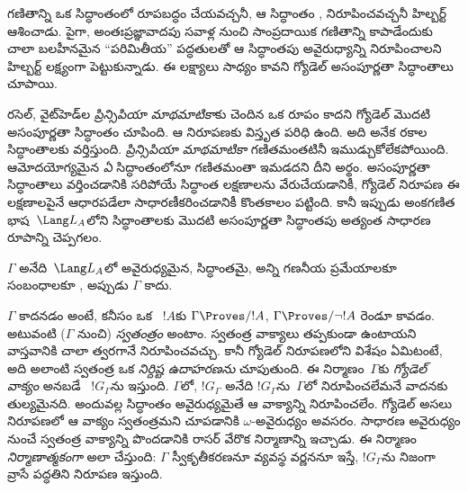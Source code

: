 \documentclass[../../../include/open-logic-section]{subfiles}
\begin{document}


గణితాన్ని ఒక  సిద్ధాంతంలో
రూపబద్ధం చేయవచ్చనీ, ఆ సిద్ధాంతం ,
 నిరూపించవచ్చనీ హిల్బర్ట్ ఆశించాడు.
పైగా, అంతఃప్రజ్ఞావాదపు సవాళ్ల నుంచి సాంప్రదాయిక గణితాన్ని కాపాడేందుకు చాలా
బలహీనమైన ``పరిమితీయ'' పద్ధతులతో ఆ సిద్ధాంతపు అవైరుధ్యాన్ని నిరూపించాలని హిల్బర్ట్
లక్ష్యంగా పెట్టుకున్నాడు. ఈ లక్ష్యాలు సాధ్యం కావని గ్యోడెల్ అసంపూర్ణతా సిద్ధాంతాలు
చూపాయి.

రసెల్, వైట్‌హెడ్‌ల \emph{ప్రిన్సిపియా మాథమాటికా}కు చెందిన ఒక రూపం
 కాదని గ్యోడెల్ మొదటి అసంపూర్ణతా సిద్ధాంతం
చూపింది. ఆ నిరూపణకు విస్తృత పరిధి ఉంది. అది అనేక రకాల సిద్ధాంతాలకు వర్తిస్తుంది.
\emph{ప్రిన్సిపియా మాథమాటికా} గణితమంతటినీ ఇముడ్చుకోలేకపోయింది.
ఆమోదయోగ్యమైన \emph{ఏ} సిద్ధాంతంలోనూ గణితమంతా ఇమడదని దీని అర్థం.
అసంపూర్ణతా సిద్ధాంతాలు వర్తించడానికి సరిపోయే సిద్ధాంత లక్షణాలను వేరుచేయడానికీ,
గ్యోడెల్ నిరూపణ ఈ లక్షణాలపైనే ఆధారపడేలా సాధారణీకరించడానికీ కొంతకాలం పట్టింది.
కానీ ఇప్పుడు అంకగణిత భాష~$\Lang L_A$లోని సిద్ధాంతాలకు మొదటి అసంపూర్ణతా
సిద్ధాంతపు అత్యంత సాధారణ రూపాన్ని చెప్పగలం.

\begin{thm}
$\Gamma$ అనేది~$\Lang L_A$లో అవైరుధ్యమైన,
 సిద్ధాంతమై, అన్ని గణనీయ
ప్రమేయాలకూ  సంబంధాలకూ
, అప్పుడు $\Gamma$
 కాదు.
\end{thm}

$\Gamma$  కాదనడం అంటే, కనీసం ఒక
~$!A$కు $\Gamma \Proves/ !A$, $\Gamma \Proves/
\lnot !A$ రెండూ కావడం. అటువంటి 
($\Gamma$ నుంచి) \emph{స్వతంత్రం} అంటాం. స్వతంత్ర వాక్యాలు తప్పకుండా ఉంటాయని
వాస్తవానికి చాలా త్వరగానే నిరూపించవచ్చు. కానీ గ్యోడెల్ నిరూపణలోని విశేషం
ఏమిటంటే, అది అలాంటి స్వతంత్ర  ఒక
\emph{నిర్దిష్ట ఉదాహరణను} చూపుతుంది. ఈ నిర్మాణం~$\Gamma$కు
\emph{గ్యోడెల్ వాక్యం} అనబడే ~$!G_\Gamma$ను
ఇస్తుంది. $\Gamma$లో, $!G_\Gamma$ అనేది $!G_\Gamma$ను~$\Gamma$లో
నిరూపించలేమనే వాదనకు తుల్యమైనది. అందువల్ల సిద్ధాంతం అవైరుధ్యమైతే ఆ
వాక్యాన్ని నిరూపించలేం. గ్యోడెల్ అసలు నిరూపణలో ఆ వాక్యం స్వతంత్రమని
చూపడానికి $\omega$-అవైరుధ్యం అవసరం. సాధారణ అవైరుధ్యం నుంచే స్వతంత్ర
వాక్యాన్ని పొందడానికి రాసర్ వేరొక నిర్మాణాన్ని ఇచ్చాడు. ఈ నిర్మాణం
\emph{నిర్మాణాత్మకంగా} అలా చేస్తుంది: $\Gamma$ స్వీకృతీకరణనూ
 వ్యవస్థ వర్ణననూ ఇస్తే, $!G_\Gamma$ను
నిజంగా వ్రాసే పద్ధతిని నిరూపణ ఇస్తుంది.
\end{document}
